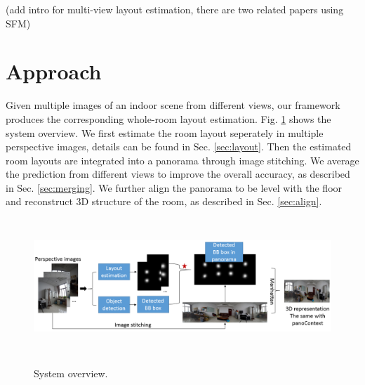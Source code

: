 (add intro for multi-view layout estimation, there are two related papers using SFM) 

\section{Approach}
Given multiple images of an indoor scene from different views, our framework produces the corresponding whole-room layout estimation. Fig. \ref{fig:overview} shows the system overview. We first estimate the room layout seperately in multiple perspective images, details can be found in Sec. \ref{sec:layout}. Then the estimated room layouts are integrated into a panorama through image stitching. We average the prediction from different views to improve the overall accuracy, as described in Sec. \ref{sec:merging}. We further align the panorama to be level with the floor and reconstruct 3D structure of the room, as described in Sec. \ref{sec:align}. 

\begin{figure}
	\includegraphics[height=2in, width=6in]{figs/ppline.png}
	\label{fig:overview}
	\caption{System overview.}
\end{figure}

